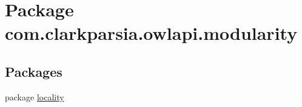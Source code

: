 \hypertarget{namespacecom_1_1clarkparsia_1_1owlapi_1_1modularity}{\section{Package com.\-clarkparsia.\-owlapi.\-modularity}
\label{namespacecom_1_1clarkparsia_1_1owlapi_1_1modularity}
}
\subsection*{Packages}
\begin{DoxyCompactItemize}
\item 
package \hyperlink{namespacecom_1_1clarkparsia_1_1owlapi_1_1modularity_1_1locality}{locality}
\end{DoxyCompactItemize}
